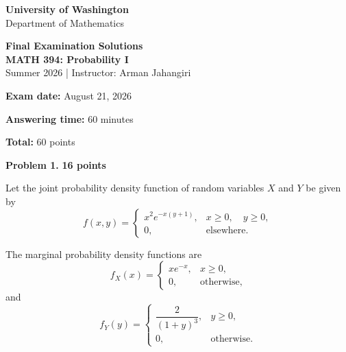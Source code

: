 \documentclass[11pt]{article}
\newcommand{\course}{MATH 394: Probability I}
\newcommand{\instructor}{Arman Jahangiri}
\newcommand{\department}{Department of Mathematics}
\newcommand{\university}{University of Washington}
\begin{document}

\begin{titlepage}
\centering
\vspace*{1.2cm}

{\Large \textbf{\university}}\\
{\large \department}

\vspace{1.4cm}

{\Huge \color{uwpurple}\textbf{Final Examination Solutions}}\\[0.25cm]
{\Large \textbf{\course}}\\[0.25cm]
{\large Summer 2026 \quad | \quad Instructor: \instructor}

\vspace{1cm}

\begin{tcolorbox}[
    width=0.78\textwidth,
    colback=softpurple,
    colframe=uwpurple,
    boxrule=0.9pt,
    arc=3mm
]
\centering
\textbf{Exam date:} August 21, 2026

\textbf{Answering time:} 60 minutes

\textbf{Total:} 60 points
\end{tcolorbox}

\end{titlepage}



\begin{problemheader}
\textbf{Problem 1.} \hfill \textbf{16 points}
\end{problemheader}

Let the joint probability density function of random variables \(X\) and \(Y\)
be given by
\[
f(x,y)
=
\begin{cases}
x^2e^{-x(y+1)}, & x\geq0,\quad y\geq0,\\
0, & \text{elsewhere}.
\end{cases}
\]

The marginal probability density functions are
\[
f_X(x)
=
\begin{cases}
xe^{-x}, & x\geq0,\\
0, & \text{otherwise},
\end{cases}
\]
and
\[
f_Y(y)
=
\begin{cases}
\dfrac{2}{(1+y)^3}, & y\geq0,\\
0, & \text{otherwise}.
\end{cases}
\]
\end{document}
